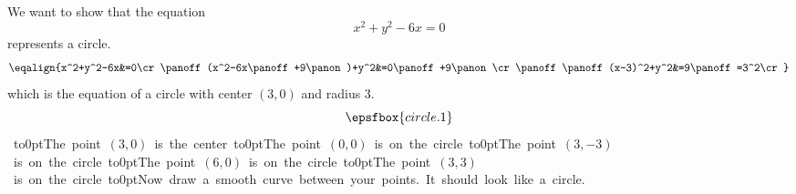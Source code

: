 

\replacementtrue
We want to show that the equation $$x^2+y^2-6x=0$$ represents a circle.
\panoff $$\eqalign{%
x^2+y^2-6x&=0\cr\panoff
(x^2-6x\panoff+9\panon)+y^2&=0\panoff+9\panon\cr
\panoff\panoff(x-3)^2+y^2&=9\panoff=3^2\cr}$$
\panoff
which is the equation of a circle with center \panoff$(3,0)$\panon{} and radius
\panoff\panoff$3$\panon\panon.
\vfill\eject
$$\epsfbox{circle.1}$$
{\offinterlineskip\hbox{\vbox{%
\vbox to0pt{The point $(3,0)$ is the center\vss}\panstop
{}\vbox to0pt{The point $(0,0)$ is on the circle\vss}\panstop\panstop
{}\vbox to0pt{The point $(3,-3)$ is on the circle\vss}\panstop\panstop
{}\vbox to0pt{The point $(6,0)$ is on the circle\vss}\panstop\panstop
{}\vbox to0pt{The point $(3,3)$ is on the circle\vss}\panstop\panstop
{}\vbox to0pt{Now draw a smooth curve between your points. It should look like a circle.\vss}\panstop\panstop
}}}
\panoff\panoff
\panoff\panoff\panoff\panoff
\bye
